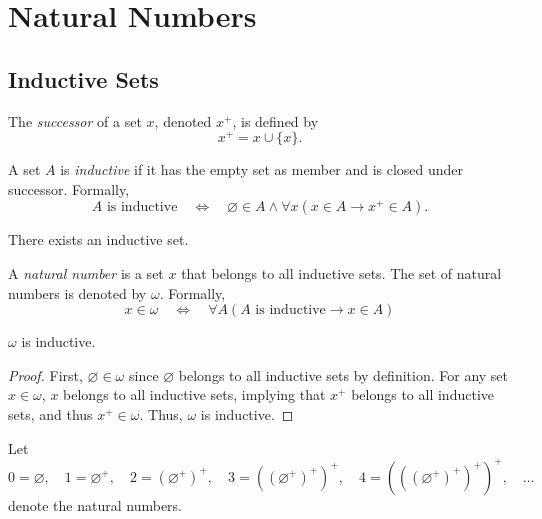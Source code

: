 \chapter{Natural Numbers}
\section{Inductive Sets}
\begin{definition}
  The \emph{successor} of a set $x$, denoted $x^+$, is defined by
  \begin{equation*}
    x^+ = x \cup \{x\}.
  \end{equation*}
\end{definition}

\begin{definition}
  A set $A$ is \emph{inductive} if it has the empty set as member and is closed
  under successor. Formally,
  \begin{equation*}
    \text{$A$ is inductive}
    \quad \Leftrightarrow \quad
    \varnothing \in A \wedge \forall x (x \in A \to x^+ \in A).
  \end{equation*}
\end{definition}

\begin{axiom}[Infinity]
  There exists an inductive set.
\end{axiom}

\begin{definition}
  A \emph{natural number} is a set $x$ that belongs to all inductive sets.
  The set of natural numbers is denoted by $\omega$.
  Formally,
  \begin{equation*}
    x \in \omega
    \quad \Leftrightarrow \quad
    \forall A (\text{$A$ is inductive} \to x \in A)
  \end{equation*}
\end{definition}

\begin{theorem}
  $\omega$ is inductive.
\end{theorem}
\begin{proof}
  First, $\varnothing \in \omega$ since $\varnothing$ belongs to all inductive
  sets by definition.
  For any set $x \in \omega$, $x$ belongs to all inductive sets, implying that
  $x^+$ belongs to all inductive sets, and thus $x^+ \in \omega$.
  Thus, $\omega$ is inductive.
\end{proof}

\begin{definition}
  Let
  \begin{equation*}
    0 = \varnothing, \quad
    1 = \varnothing^+, \quad
    2 = (\varnothing^+)^+, \quad
    3 = ((\varnothing^+)^+)^+, \quad
    4 = (((\varnothing^+)^+)^+)^+, \quad
    \dots
  \end{equation*}
  denote the natural numbers.
\end{definition}

